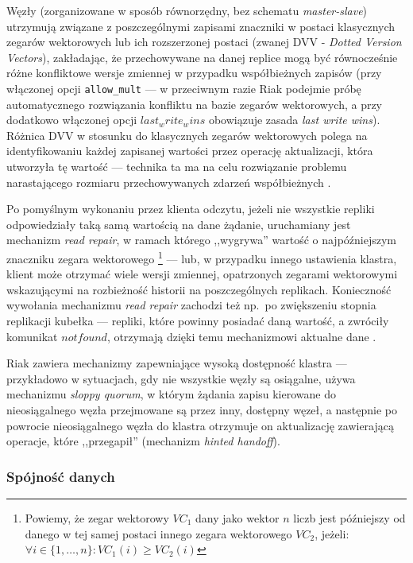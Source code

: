 Węzły (zorganizowane w sposób równorzędny, bez schematu \textit{master-slave}) utrzymują związane z poszczególnymi zapisami znaczniki w postaci klasycznych zegarów wektorowych lub ich rozszerzonej postaci (zwanej DVV - \textit{Dotted Version Vectors}), zakładając, że przechowywane na danej replice mogą być równocześnie różne konfliktowe wersje zmiennej w przypadku współbieżnych zapisów (przy włączonej opcji \texttt{allow\_mult} --- w przeciwnym razie Riak podejmie próbę automatycznego rozwiązania konfliktu na bazie zegarów wektorowych, a przy dodatkowo włączonej opcji $last_write_wins$ obowiązuje zasada \textit{last write wins}). Różnica DVV w stosunku do klasycznych zegarów wektorowych polega na identyfikowaniu każdej zapisanej wartości przez operację aktualizacji, która utworzyła tę wartość --- technika ta ma na celu rozwiązanie problemu narastającego rozmiaru przechowywanych zdarzeń współbieżnych \cite{riakdvv}.

Po pomyślnym wykonaniu przez klienta odczytu, jeżeli nie wszystkie repliki odpowiedziały taką samą
wartością na dane żądanie, uruchamiany jest mechanizm \textit{read repair}, w ramach którego
,,wygrywa'' wartość o najpóźniejszym znaczniku zegara wektorowego \footnote{Powiemy, że zegar
wektorowy $VC_1$ dany jako wektor $n$ liczb jest późniejszy od danego w tej samej postaci innego
zegara wektorowego $VC_2$, jeżeli: $\forall i\in\{1,\dots,n\} : VC_1(i)\geq VC_2(i)$} --- lub, w
przypadku innego ustawienia klastra, klient może otrzymać wiele wersji zmiennej, opatrzonych
zegarami wektorowymi wskazującymi na rozbieżność historii na poszczególnych replikach. Konieczność
wywołania mechanizmu \textit{read repair} zachodzi też np.\ po zwiększeniu stopnia replikacji kubełka --- repliki, które powinny posiadać daną wartość, a zwróciły komunikat $not found$, otrzymają dzięki temu mechanizmowi aktualne dane \cite{riakrepl}.

Riak zawiera mechanizmy zapewniające wysoką dostępność klastra --- przykładowo w sytuacjach, gdy nie wszystkie węzły są osiągalne, używa mechanizmu \textit{sloppy quorum}, w którym żądania zapisu kierowane do nieosiągalnego węzła przejmowane są przez inny, dostępny węzeł, a następnie po powrocie nieosiągalnego węzła do klastra otrzymuje on aktualizację zawierającą operacje, które ,,przegapił'' (mechanizm \textit{hinted handoff}). \cite{riakgloss}

\subsubsection*{Spójność danych}

